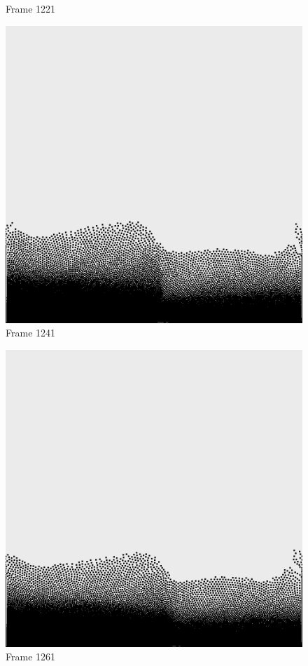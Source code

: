 \documentclass[a4paper, 12pt, oneside]{book}
\begin{document}
\begin{figure}[!ht]
\begin{center}
            Frame 1221
        \end{center}
    \endminipage
    \hfill
        \begin{center}
            \includegraphics[width=\linewidth]{images/test_case_2/1241.png}
            Frame 1241
        \end{center}
    \endminipage
    \hfill
        \begin{center}
            \includegraphics[width=\linewidth]{images/test_case_2/1261.png}
            Frame 1261
        \end{center}
    \endminipage
    \hfill


\end{figure}
\end{document}
